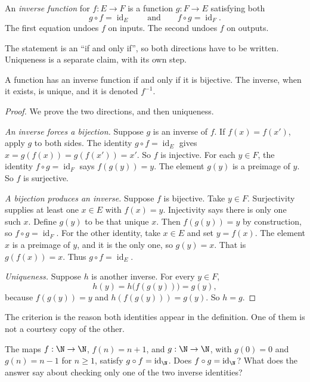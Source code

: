 An \emph{inverse function} for $f:E\to F$ is a function $g:F\to E$ satisfying both
\[
g\circ f=\operatorname{id}_E\qquad\text{and}\qquad f\circ g=\operatorname{id}_F.
\]
The first equation undoes $f$ on inputs. The second undoes $f$ on outputs.

The statement is an ``if and only if'', so both directions have to be written. Uniqueness is a separate claim, with its own step.

\begin{theorem}\label{thm:lang-inverse}
A function has an inverse function if and only if it is bijective. The inverse, when it exists, is unique, and it is denoted $f^{-1}$.
\end{theorem}
\begin{proof}
We prove the two directions, and then uniqueness.

\emph{An inverse forces a bijection.} Suppose $g$ is an inverse of $f$. If $f(x)=f(x')$, apply $g$ to both sides. The identity $g\circ f=\operatorname{id}_E$ gives $x=g(f(x))=g(f(x'))=x'$. So $f$ is injective. For each $y\in F$, the identity $f\circ g=\operatorname{id}_F$ says $f(g(y))=y$. The element $g(y)$ is a preimage of $y$. So $f$ is surjective.

\emph{A bijection produces an inverse.} Suppose $f$ is bijective. Take $y\in F$. Surjectivity supplies at least one $x\in E$ with $f(x)=y$. Injectivity says there is only one such $x$. Define $g(y)$ to be that unique $x$. Then $f(g(y))=y$ by construction, so $f\circ g=\operatorname{id}_F$. For the other identity, take $x\in E$ and set $y=f(x)$. The element $x$ is a preimage of $y$, and it is the only one, so $g(y)=x$. That is $g(f(x))=x$. Thus $g\circ f=\operatorname{id}_E$.

\emph{Uniqueness.} Suppose $h$ is another inverse. For every $y\in F$,
\[
h(y)=h\bigl(f(g(y))\bigr)=g(y),
\]
because $f(g(y))=y$ and $h(f(g(y)))=g(y)$. So $h=g$.
\end{proof}

The criterion is the reason both identities appear in the definition. One of them is not a courtesy copy of the other.

\begin{think}
The maps $f:\N\to\N$, $f(n)=n+1$, and $g:\N\to\N$, with $g(0)=0$ and $g(n)=n-1$ for $n\ge 1$, satisfy $g\circ f=\operatorname{id}_{\N}$. Does $f\circ g=\operatorname{id}_{\N}$? What does the answer say about checking only one of the two inverse identities?
\end{think}

